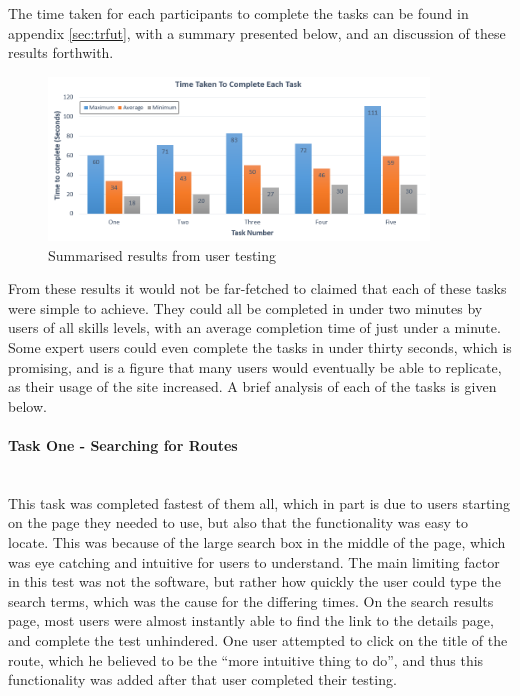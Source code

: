 \newpage
\noindent
The time taken for each participants to complete the tasks can be found in appendix \ref{sec:trfut}, with a summary presented below, and an discussion of these results forthwith.

\begin{figure}[!ht]
	\vspace{-1mm}
	\begin{center}
		\includegraphics[width=0.9\textwidth]{images/testing/results.png}
	\end{center}
	\vspace{-7mm}
	\caption{Summarised results from user testing}	
	\vspace{-2mm}
\end{figure}

\noindent
From these results it would not be far-fetched to claimed that each of these tasks were simple to achieve. They could all be completed in under two minutes by users of all skills levels, with an average completion time of just under a minute. Some expert users could even complete the tasks in under thirty seconds, which is promising, and is a figure that many users would eventually be able to replicate, as their usage of the site increased. A brief analysis of each of the tasks is given below.

\paragraph{Task One - Searching for Routes}\ \\
This task was completed fastest of them all, which in part is due to users starting on the page they needed to use, but also that the functionality was easy to locate. This was because of the large search box in the middle of the page, which was eye catching and intuitive for users to understand. The main limiting factor in this test was not the software, but rather how quickly the user could type the search terms, which was the cause for the differing times. On the search results page, most users were almost instantly able to find the link to the details page, and complete the test unhindered. One user attempted to click on the title of the route, which he believed to be the ``more intuitive thing to do'', and thus this functionality was added after that user completed their testing.

